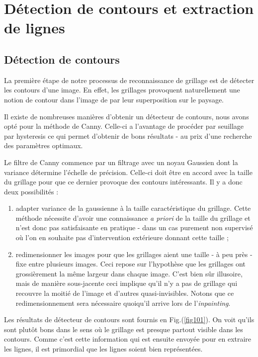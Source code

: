 \section{Détection de contours et extraction de lignes}

\subsection{Détection de contours}

La première étape de notre processus de reconnaissance de grillage est de détecter les contours d'une image. En effet, les grillages provoquent naturellement une notion de contour dans l'image de par leur superposition sur le paysage.

Il existe de nombreuses manières d'obtenir un détecteur de contours, nous avons opté pour la méthode de Canny. Celle-ci a l'avantage de procéder par seuillage par hysteresis ce qui permet d'obtenir de bons résultats - au prix d'une recherche des paramètres optimaux.

Le filtre de Canny commence par un filtrage avec un noyau Gaussien dont la variance détermine l'échelle de précision. Celle-ci doit être en accord avec la taille du grillage pour que ce dernier provoque des contours intéressants. Il y a donc deux possibilités :
\begin{enumerate}
\item adapter variance de la gaussienne à la taille caractéristique du grillage. Cette méthode nécessite d'avoir une connaissance \emph{a priori} de la taille du grillage et n'est donc pas satisfaisante en pratique - dans un cas purement non supervisé où l'on en souhaite pas d'intervention extérieure donnant cette taille ;
\item redimensionner les images pour que les grillages aient une taille - à peu près - fixe entre plusieurs images. Ceci repose sur l'hypothèse que les grillages ont grossièrement la même largeur dans chaque image. C'est bien sûr illusoire, mais de manière sous-jacente ceci implique qu'il n'y a pas de grillage qui recouvre la moitié de l'image et d'autres quasi-invisibles. Notons que ce redimensionnement sera nécessaire quoiqu'il arrive lors de l'\emph{inpainting}.
\end{enumerate}

Les résultats de détecteur de contours sont fournis en Fig.(\ref{fig101}). On voit qu'ils sont plutôt bons dans le sens où le grillage est presque partout visible dans les contours. Comme c'est cette information qui est ensuite envoyée pour en extraire les lignes, il est primordial que les lignes soient bien représentées.

